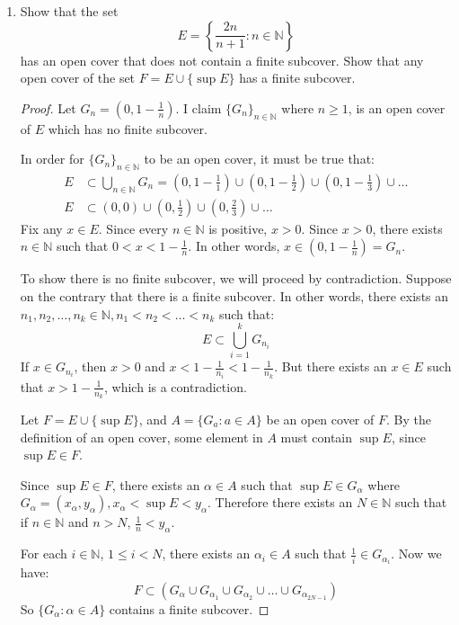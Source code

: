 \documentclass[12pt]{amsart}
\begin{document}
\begin{enumerate}
\begin{proof}
The proof of the nested interval property breaks down with open intervals because it works with increasingly smaller intervals. Eventually you will be left with a situation where you have $[x,x]$ for some $x\in\mathbb R$, which works fine because $[x,x]$ is not empty. Conversely, the open interval $(x,x)$ is empty, and this is the reason the property fails for open intervals.
\end{proof}

\item Show that the set 
%
\[ E = \left\{ \frac{2n}{n+1} : n \in \mathbb{N}\right\} \]
%
has an open cover that does not contain a finite subcover.  Show that any open cover of the set $F=E\cup \{\sup E\}$ has a finite subcover.
\begin{proof}
Let $G_n = (0, 1-\frac 1 n)$. I claim $\{G_n\}_{n\in\mathbb N}$ where $n\ge 1$, is an open cover of $E$ which has no finite subcover.

In order for $\{G_n\}_{n\in\mathbb N}$ to be an open cover, it must be true that:
\begin{align*}
E &\subset \bigcup_{n\in\mathbb N} G_n = \left(0,1-\frac 1 1\right)\cup\left(0,1-\frac 1 2\right)\cup\left(0,1-\frac 1 3\right)\cup\ldots \\
E &\subset \left(0,0\right)\cup\left(0,\frac 1 2\right)\cup\left(0,\frac 2 3\right)\cup\ldots
\end{align*}
Fix any $x\in E$. Since every $n\in\mathbb N$ is positive, $x>0$. Since $x>0$, there exists $n\in\mathbb N$ such that $0<x<1-\frac 1 n$. In other words, $x\in(0,1-\frac 1 n) = G_n$.

To show there is no finite subcover, we will proceed by contradiction. Suppose on the contrary that there is a finite subcover. In other words, there exists an $n_1, n_2, \ldots, n_k\in\mathbb N, n_1<n_2<\ldots<n_k$ such that:
\[ E \subset \bigcup_{i=1}^k G_{n_i} \]
If $x\in G_{n_i}$, then $x>0$ and $x<1-\frac 1 {n_i} < 1-\frac 1 {n_k}$. But there exists an $x\in E$ such that $x>1-\frac 1 {n_k}$, which is a contradiction.

\bigskip

Let $F = E\cup \{\sup E\}$, and $A=\{G_a : a \in A\}$ be an open cover of $F$. By the definition of an open cover, some element in $A$ must contain $\sup E$, since $\sup E\in F$.

Since $\sup E\in F$, there exists an $\alpha\in A$ such that $\sup E \in G_\alpha$ where $G_\alpha=(x_\alpha,y_\alpha), x_\alpha < \sup E < y_\alpha$. Therefore there exists an $N\in\mathbb N$ such that if $n\in\mathbb N$ and $n>N$, $\frac 1 n < y_\alpha$.

For each $i\in\mathbb N$, $1\le i < N$, there exists an $\alpha_i\in A$ such that $\frac 1 i \in G_{\alpha_i}$. Now we have:
\[ F \subset (G_\alpha \cup G_{\alpha_1} \cup G_{\alpha_2} \cup \ldots \cup G_{\alpha_{2N-1}}) \]
So $\{G_\alpha : \alpha\in A \}$ contains a finite subcover.
\end{proof}

\end{enumerate} 
\end{document}
